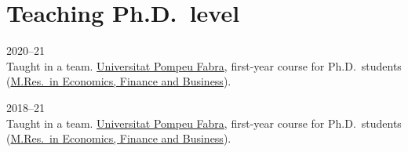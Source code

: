 \section*{Teaching \small{Ph.D.\ level}}

\begin{paracol}{2}
  2020--21
\switchcolumn
  \\
  Taught in a team.
  \href{https://www.upf.edu/}{Universitat Pompeu Fabra}, first-year course for Ph.D.\ students (\href{https://www.upf.edu/web/econ/mres-i-phd}{M.Res.\ in Economics, Finance and Business}).
\end{paracol}

\begin{paracol}{2}
  2018--21
\switchcolumn
  \\
  Taught in a team.
  \href{https://www.upf.edu/}{Universitat Pompeu Fabra}, first-year course for Ph.D.\ students (\href{https://www.upf.edu/web/econ/mres-i-phd}{M.Res.\ in Economics, Finance and Business}).
\end{paracol}